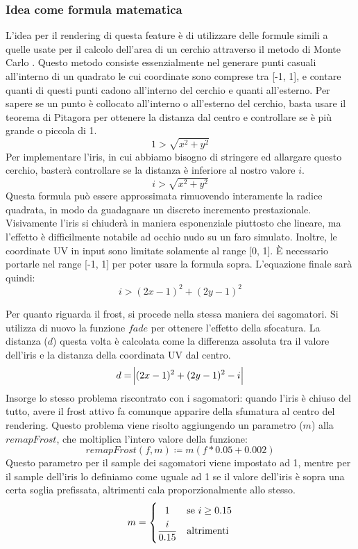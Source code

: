 \documentclass[main.tex]{subfiles}
\begin{document}
\subsubsection{Idea come formula matematica}\label{subsec:5_2_IrisMath}
L'idea per il rendering di questa feature è di utilizzare delle formule simili a quelle usate per il calcolo dell'area di un cerchio attraverso il metodo di Monte Carlo \cite{circleMonteCarlo}. Questo metodo consiste essenzialmente nel generare punti casuali all'interno di un quadrato le cui coordinate sono comprese tra [-1, 1], e contare quanti di questi punti cadono all'interno del cerchio e quanti all'esterno. Per sapere se un punto è collocato all'interno o all'esterno del cerchio, basta usare il teorema di Pitagora per ottenere la distanza dal centro e controllare se è più grande o piccola di 1.
\[1 > \sqrt{x^2 + y^2}\]
Per implementare l'iris, in cui abbiamo bisogno di stringere ed allargare questo cerchio, basterà controllare se la distanza è inferiore al nostro valore $i$.
\[i > \sqrt{x^2 + y^2}\]
Questa formula può essere approssimata rimuovendo interamente la radice quadrata, in modo da guadagnare un discreto incremento prestazionale. Visivamente l'iris si chiuderà in maniera esponenziale piuttosto che lineare, ma l'effetto è difficilmente notabile ad occhio nudo su un faro simulato. \newline
Inoltre, le coordinate UV in input sono limitate solamente al range [0, 1]. È necessario portarle nel range [-1, 1] per poter usare la formula sopra. \newline
L'equazione finale sarà quindi:
\[i > (2x - 1)^2 + (2y - 1)^2\]
\newline

Per quanto riguarda il frost, si procede nella stessa maniera dei sagomatori. Si utilizza di nuovo la funzione $fade$ per ottenere l'effetto della sfocatura. La distanza ($d$) questa volta è calcolata come la differenza assoluta tra il valore dell'iris e la distanza della coordinata UV dal centro.
\[d = \abs{(2x - 1)^2 + (2y - 1)^2 - i}\]
Insorge lo stesso problema riscontrato con i sagomatori: quando l'iris è chiuso del tutto, avere il frost attivo fa comunque apparire della sfumatura al centro del rendering. Questo problema viene risolto aggiungendo un parametro ($m$) alla $remapFrost$, che moltiplica l'intero valore della funzione:
\[remapFrost(f, m) \coloneqq m(f * 0.05 + 0.002)\]
Questo parametro per il sample dei sagomatori viene impostato ad 1, mentre per il sample dell'iris lo definiamo come uguale ad 1 se il valore dell'iris è sopra una certa soglia prefissata, altrimenti cala proporzionalmente allo stesso.
\[m = 
    \begin{dcases}
        \hfil 1 & \text{se } i \geq 0.15\\
        \frac{i}{0.15} & \text{altrimenti}
    \end{dcases}
\]
\end{document}
